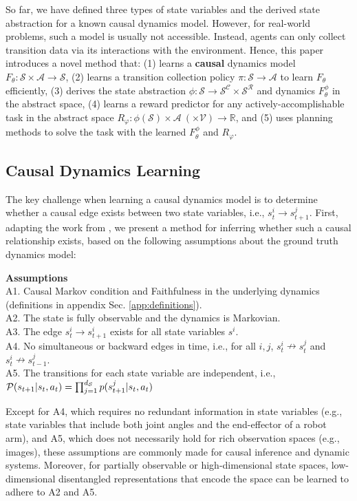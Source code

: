 So far, we have defined three types of state variables and the derived state abstraction for a known causal dynamics model. However, for real-world problems, such a model is usually not accessible. Instead, agents can only collect transition data via its interactions with the environment. Hence, this paper introduces a novel method that: (1) learns a \textbf{causal} dynamics model $F_\theta: \mathcal{S} \times \mathcal{A} \rightarrow \mathcal{S}$, (2) learns a transition collection policy $\pi: \mathcal{S} \rightarrow \mathcal{A}$ to learn $F_\theta$ efficiently, (3) derives the state abstraction $\phi: \mathcal{S} \rightarrow \mathcal{S}^\mathcal{C} \times \mathcal{S}^\mathcal{R}$ and dynamics $F^\phi_\theta$ in the abstract space, (4) learns a reward predictor for any actively-accomplishable task in the abstract space $R_\varphi: \phi(\mathcal{S}) \times \mathcal{A} \ (\times \mathcal{V}) \rightarrow \mathbb{R}$, and (5) uses planning methods to solve the task with the learned $F^\phi_\theta$ and $R_\varphi$.

\subsection{Causal Dynamics Learning}

The key challenge when learning a causal dynamics model is to determine whether a causal edge exists between two state variables, i.e., $s_t^i \rightarrow s^j_{t+1}$. First, adapting the work from \citet{mastakouri2021necessary}, we present a method for inferring whether such a causal relationship exists, based on the following assumptions about the ground truth dynamics model:

\textbf{Assumptions}\\
A1. Causal Markov condition and Faithfulness in the underlying dynamics (definitions in appendix Sec. \ref{app:definitions}).\\
A2. The state is fully observable and the dynamics is Markovian.\\
A3. The edge $s_t^i \rightarrow s^i_{t+1}$ exists for all state variables $s^i$.\\
A4. No simultaneous or backward edges in time, i.e., for all $i, j$, $s_t^i \nrightarrow s^j_{t}$ and $s_t^i \nrightarrow s^j_{t-1}$.\\
A5. The transitions for each state variable are independent, i.e., $\mathcal{P}(s_{t+1}|s_t, a_t) = \prod_{j=1}^{d_\mathcal{S}} p(s^j_{t+1}|s_t, a_t)$

Except for A4, which requires no redundant information in state variables (e.g., state variables that include both joint angles and the end-effector of a robot arm), and A5, which does not necessarily hold for rich observation spaces (e.g., images), these assumptions are commonly made for causal inference and dynamic systems. Moreover, for partially observable or high-dimensional state spaces, low-dimensional disentangled representations that encode the space can be learned to adhere to A2 and A5.

